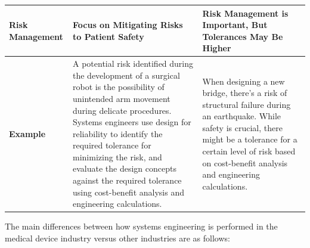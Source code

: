 \documentclass[conference]{IEEEtran}
\begin{document}
\begin{table}[t]
\begin{tabular}{|p{2.5cm}|p{6.5cm}|p{6.5cm}|}
    \textbf{Risk Management} & Focus on Mitigating Risks to Patient Safety                                                                                                                                                                                                                                                                                                                                                                    & Risk Management is Important, But Tolerances May Be Higher                                                                                                                                                                                                                                                                                                                                                                                                  \\ \hline
    \textbf{Example}         & A potential risk identified during the development of a surgical robot is the possibility of unintended arm movement during delicate procedures. Systems engineers use design for reliability to identify the required tolerance for minimizing the risk, and evaluate the design concepts against the required tolerance using cost-benefit analysis and engineering calculations.                            & When designing a new bridge, there's a risk of structural failure during an earthquake. While safety is crucial, there might be a tolerance for a certain level of risk based on cost-benefit analysis and engineering calculations.                                                                                                                                                                                                                        \\ \hline
    \end{tabular}
    \end{table}

    The main differences between how systems engineering is 
    performed in the medical device industry versus other 
    industries are as follows:
\end{document}
